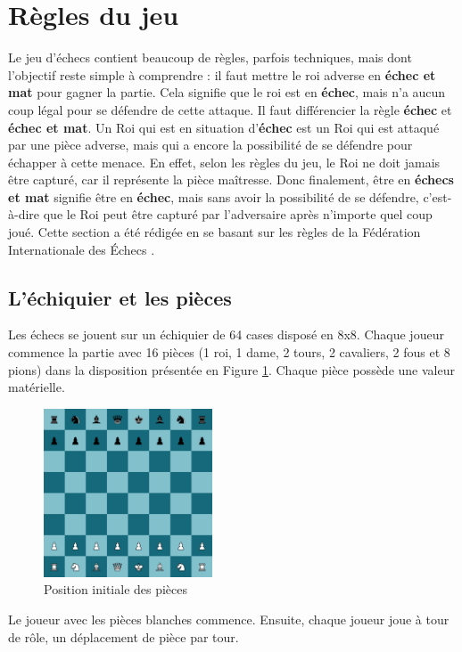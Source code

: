 \documentclass{article}
\begin{document}
\section{Règles du jeu}
Le jeu d'échecs contient beaucoup de règles, parfois techniques, mais dont l'objectif reste simple à comprendre :
il faut mettre le roi adverse en \textbf{échec et mat} pour gagner la partie. Cela signifie que le roi est en \textbf{échec},
mais n'a aucun coup légal pour se défendre de cette attaque. Il faut différencier la règle \textbf{échec} et 
\textbf{échec et mat}. Un Roi qui est en situation d'\textbf{échec} est un Roi qui est attaqué par une pièce
adverse, mais qui a encore la possibilité de se défendre pour échapper à cette menace. En effet, selon les règles du jeu, le Roi ne doit jamais être capturé, car il représente la pièce maîtresse. 
Donc finalement, être en \textbf{échecs et mat} signifie être en \textbf{échec}, mais sans avoir
la possibilité de se défendre, c'est-à-dire que le Roi peut être capturé par l'adversaire après n'importe quel coup joué.
Cette section a été rédigée en se basant sur les règles de la Fédération Internationale des Échecs \cite{FIDE2021}.

\subsection{L'échiquier et les pièces}
Les échecs se jouent sur un échiquier de 64 cases disposé en 8x8. Chaque joueur commence la partie avec 16 pièces (1 roi, 1 dame, 2 tours,
2 cavaliers, 2 fous et 8 pions) dans la disposition présentée en Figure \ref{init}. Chaque pièce possède une valeur matérielle.


\begin{figure}[h]
    \centering
    \includegraphics[width=\textwidth,height=5.0cm,keepaspectratio]{jeuDepart.png}
    \caption{Position initiale des pièces}
    \label{init}
\end{figure}

Le joueur avec les pièces blanches commence. Ensuite, chaque joueur joue à tour de rôle, un déplacement de pièce par tour.
\end{document}
